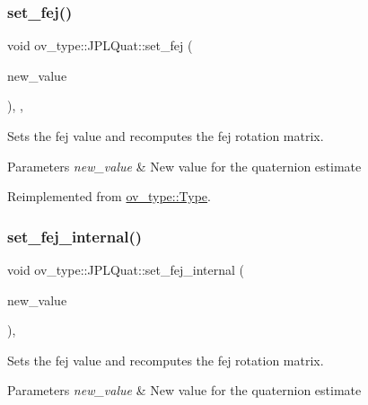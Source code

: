 \subsubsection{\texorpdfstring{set\+\_\+fej()}{set\_fej()}}
{\footnotesize\ttfamily void ov\+\_\+type\+::\+J\+P\+L\+Quat\+::set\+\_\+fej (\begin{DoxyParamCaption}\item[{const Eigen\+::\+Matrix\+Xd \&}]{new\+\_\+value }\end{DoxyParamCaption})\hspace{0.3cm}{\ttfamily [inline]}, {\ttfamily [override]}, {\ttfamily [virtual]}}



Sets the fej value and recomputes the fej rotation matrix. 


\begin{DoxyParams}{Parameters}
{\em new\+\_\+value} & New value for the quaternion estimate \\
\hline
\end{DoxyParams}


Reimplemented from \hyperlink{classov__type_1_1Type_ab8345946b27cb43e0cfc36454a06686d}{ov\+\_\+type\+::\+Type}.

\mbox{\label{classov__type_1_1JPLQuat_ac1e67273e4414bc4a162787ff6d73a48}} 
\subsubsection{\texorpdfstring{set\+\_\+fej\+\_\+internal()}{set\_fej\_internal()}}
{\footnotesize\ttfamily void ov\+\_\+type\+::\+J\+P\+L\+Quat\+::set\+\_\+fej\+\_\+internal (\begin{DoxyParamCaption}\item[{const Eigen\+::\+Matrix\+Xd \&}]{new\+\_\+value }\end{DoxyParamCaption})\hspace{0.3cm}{\ttfamily [inline]}, {\ttfamily [protected]}}



Sets the fej value and recomputes the fej rotation matrix. 


\begin{DoxyParams}{Parameters}
{\em new\+\_\+value} & New value for the quaternion estimate \\
\hline
\end{DoxyParams}
\mbox{\label{classov__type_1_1JPLQuat_a51847b09cfc48c3d869d08ecd7f4821d}} 
